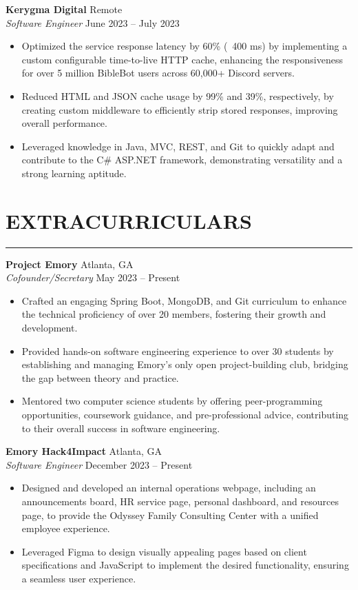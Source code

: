 \documentclass[10.5pt]{article}
\begin{document}
\noindent
\textbf{Kerygma Digital} \hfill {Remote}\\
\emph{Software Engineer} \hfill {June 2023} -- {July 2023}
\begin{itemize}
    \item Optimized the service response latency by 60\% (~400 ms) by implementing a custom configurable time-to-live HTTP cache, enhancing the responsiveness for over 5 million BibleBot users across 60,000+ Discord servers. \item Reduced HTML and JSON cache usage by 99\% and 39\%, respectively, by creating custom middleware to efficiently strip stored responses, improving overall performance. \item Leveraged knowledge in Java, MVC, REST, and Git to quickly adapt and contribute to the C\# ASP.NET framework, demonstrating versatility and a strong learning aptitude.
\end{itemize}

 \vspace{-\baselineskip}\section*{\large\textbf{EXTRACURRICULARS}}
\vspace{-\baselineskip}
\noindent\rule{\textwidth}{0.4pt}


\noindent
\textbf{Project Emory} \hfill {Atlanta, GA} \\
\emph{Cofounder/Secretary} \hfill {May 2023} -- {Present}
\begin{itemize}
    \item Crafted an engaging Spring Boot, MongoDB, and Git curriculum to enhance the technical proficiency of over 20 members, fostering their growth and development. \item Provided hands-on software engineering experience to over 30 students by establishing and managing Emory's only open project-building club, bridging the gap between theory and practice. \item Mentored two computer science students by offering peer-programming opportunities, coursework guidance, and pre-professional advice, contributing to their overall success in software engineering.
\end{itemize}

\noindent
\textbf{Emory Hack4Impact} \hfill {Atlanta, GA} \\
\emph{Software Engineer} \hfill {December 2023} -- {Present}
\begin{itemize}
    \item Designed and developed an internal operations webpage, including an announcements board, HR service page, personal dashboard, and resources page, to provide the Odyssey Family Consulting Center with a unified employee experience. \item Leveraged Figma to design visually appealing pages based on client specifications and JavaScript to implement the desired functionality, ensuring a seamless user experience.
\end{itemize}
\end{document}
